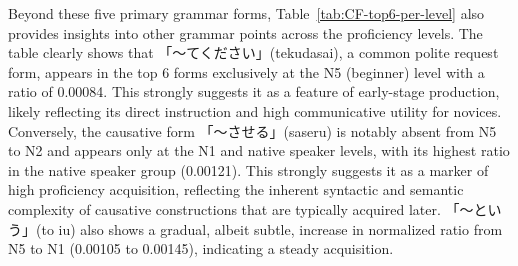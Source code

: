 Beyond these five primary grammar forms, Table~\ref{tab:CF-top6-per-level} also provides insights into other grammar
points across the proficiency levels. The table clearly shows that 「〜てください」(tekudasai), a common polite request
form, appears in the top 6 forms exclusively at the N5 (beginner) level with a ratio of 0.00084. This strongly
suggests it as a feature of early-stage production, likely reflecting its direct instruction and high communicative
utility for novices. Conversely, the causative form 「〜させる」(saseru) is notably absent from N5 to N2 and appears only
at the N1 and native speaker levels, with its highest ratio in the native speaker group (0.00121). This strongly
suggests it as a marker of high proficiency acquisition, reflecting the inherent syntactic and semantic complexity
of causative constructions that are typically acquired later. 「〜という」(to iu) also shows a gradual, albeit subtle,
increase in normalized ratio from N5 to N1 (0.00105 to 0.00145), indicating a steady acquisition.

\begin{table}[h!]
\centering
\small
{}
\caption{Top 6 Grammar Forms by Ratio Across JLPT Levels (Top 6 per level)}
\label{tab:CF-top6-per-level}
\end{table}




